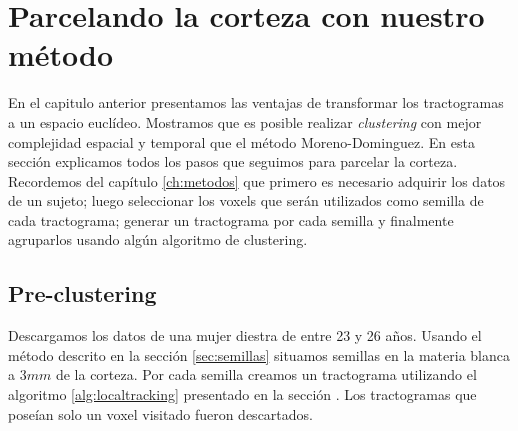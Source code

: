 \chapter{Parcelando la corteza con nuestro m\'etodo} 

En el capitulo anterior presentamos las ventajas de transformar los tractogramas
a un espacio eucl\'ideo. Mostramos que es posible realizar \textit{clustering} 
con mejor complejidad espacial y temporal que el m\'etodo Moreno-Dominguez. En esta
secci\'on explicamos todos los pasos que seguimos para parcelar la corteza. 
Recordemos del cap\'itulo \ref{ch:metodos} que primero es necesario adquirir 
los datos de un sujeto; luego seleccionar los voxels que ser\'an utilizados como
semilla de cada tractograma; generar un tractograma por cada semilla y finalmente
agruparlos usando alg\'un algoritmo de clustering. \\

\section{Pre-clustering}

Descargamos los datos de una mujer diestra de entre 23 y 26 a\~nos. Usando el
m\'etodo descrito en la secci\'on \ref{sec:semillas} situamos semillas
en la materia blanca a $3mm$ de la corteza. Por cada semilla creamos
un tractograma utilizando el algoritmo \ref{alg:localtracking} presentado en la
secci\'on \label{sec:convergencia}. Los tractogramas que pose\'ian solo un voxel
visitado fueron descartados.\\

\settowidth{}
\addtolength\mylen{\parindent}

